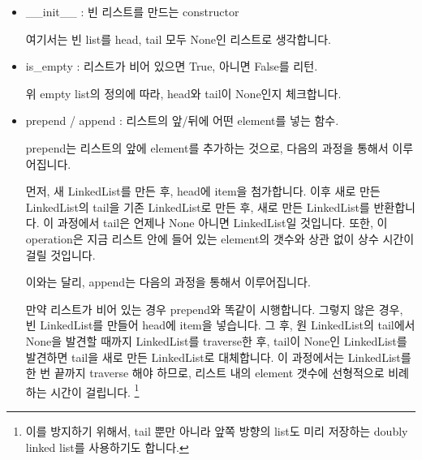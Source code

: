 \documentclass[titlepage]{report}
\begin{document}
\begin{itemize} 
\item \_\_init\_\_ : 빈 리스트를 만드는 constructor
 
                
여기서는 빈 list를 head, tail 모두 None인 리스트로 생각합니다. 

\item is\_empty : 리스트가 비어 있으면 True, 아니면 False를 리턴. 
 
                
위 empty list의 정의에 따라, head와 tail이 None인지 체크합니다. 

\item prepend / append : 리스트의 앞/뒤에 어떤 element를 넣는 함수. 

prepend는 리스트의 앞에 element를 추가하는 것으로, 다음의 과정을 통해서 이루어집니다. 

 
                
먼저, 새 LinkedList를 만든 후, head에 item을 첨가합니다. 이후 새로 만든 LinkedList의 tail을 기존 LinkedList로 만든 후, 새로 만든 LinkedList를 반환합니다. 이 과정에서 tail은 언제나 None 아니면 LinkedList일 것입니다. 또한, 이 operation은 지금 리스트 안에 들어 있는 element의 갯수와 상관 없이 상수 시간이 걸릴 것입니다. 

이와는 달리, append는 다음의 과정을 통해서 이루어집니다. 
                
 
                
만약 리스트가 비어 있는 경우 prepend와 똑같이 시행합니다. 그렇지 않은 경우, 빈 LinkedList를 만들어 head에 item을 넣습니다. 그 후, 원 LinkedList의 tail에서 None을 발견할 때까지 LinkedList를 traverse한 후, tail이 None인 LinkedList를 발견하면 tail을 새로 만든 LinkedList로 대체합니다. 이 과정에서는 LinkedList를 한 번 끝까지 traverse 해야 하므로, 리스트 내의 element 갯수에 선형적으로 비례하는 시간이 걸립니다. \footnote{이를 방지하기 위해서, tail 뿐만 아니라 앞쪽 방향의 list도 미리 저장하는 doubly linked list를 사용하기도 합니다.} 


\end{itemize}
\end{document}
